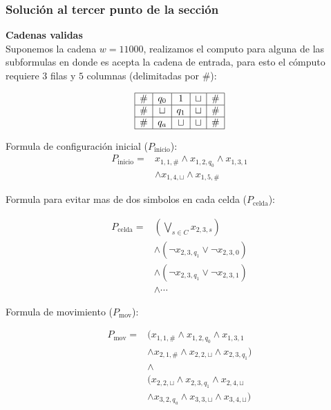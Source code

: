 \subsubsection*{Solución al tercer punto de la sección}

\textbf{Cadenas validas}\\

Suponemos la cadena \textbf{$w=11000$}, realizamos el computo para alguna de las subformulas en donde es acepta la cadena de entrada, para esto el cómputo requiere $3$ filas y $5$ columnas (delimitadas por $\#$):

\[
\begin{array}{|c|c|c|c|c|}
\hline
\# & q_0 & 1 & \sqcup & \# \\
\hline
\# & \sqcup & q_1 & \sqcup & \# \\
\hline
\# & q_a & \sqcup & \sqcup & \# \\
\hline
\end{array}
\]

Formula de configuración inicial ($P_{\mathrm{inicio}}$):
\[
\begin{aligned}
P_{\mathrm{inicio}} ={}&
x_{1,1,\#} \wedge x_{1,2,q_0}
\wedge x_{1,3,1} \\
&\wedge x_{1,4,\sqcup}
\wedge x_{1,5,\#}
\end{aligned}
\]

Formula para evitar mas de dos simbolos en cada celda ($P_{\mathrm{celda}}$):

\[
\begin{aligned}
P_{\mathrm{celda}} ={}&
\left(\bigvee_{s \in C} x_{2,3,s}\right)\\
&\wedge (\neg x_{2,3,q_1} \vee \neg x_{2,3,0})\\
&\wedge (\neg x_{2,3,q_1} \vee \neg x_{2,3,1})\\
&\wedge \cdots
\end{aligned}
\]

Formula de movimiento ($P_{\mathrm{mov}}$):

\[
\begin{aligned}
P_{\mathrm{mov}} ={}&
(x_{1,1,\#} \wedge x_{1,2,q_0}
\wedge x_{1,3,1}\\
&\wedge x_{2,1,\#}
\wedge x_{2,2,\sqcup}
\wedge x_{2,3,q_1})\\
&\wedge\\
&(x_{2,2,\sqcup}
\wedge x_{2,3,q_1}
\wedge x_{2,4,\sqcup}\\
&\wedge x_{3,2,q_a}
\wedge x_{3,3,\sqcup}
\wedge x_{3,4,\sqcup})
\end{aligned}
\]

